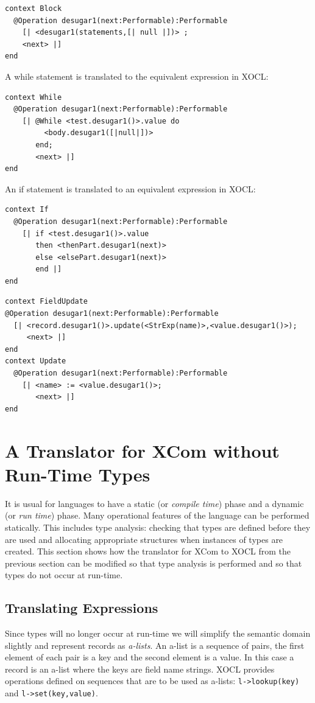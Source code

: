 \begin{lstlisting}
context Block
  @Operation desugar1(next:Performable):Performable
    [| <desugar1(statements,[| null |])> ; 
    <next> |]
end
\end{lstlisting}A while statement is translated to the equivalent expression in XOCL:

\begin{lstlisting}
context While
  @Operation desugar1(next:Performable):Performable
    [| @While <test.desugar1()>.value do
         <body.desugar1([|null|])>
       end;
       <next> |]
end
\end{lstlisting}An if statement is translated to an equivalent expression in XOCL:

\begin{lstlisting}
context If
  @Operation desugar1(next:Performable):Performable
    [| if <test.desugar1()>.value
       then <thenPart.desugar1(next)>
       else <elsePart.desugar1(next)>
       end |]
end
\end{lstlisting}\begin{lstlisting}
context FieldUpdate
@Operation desugar1(next:Performable):Performable
  [| <record.desugar1()>.update(<StrExp(name)>,<value.desugar1()>);
     <next> |]
end
context Update
  @Operation desugar1(next:Performable):Performable
    [| <name> := <value.desugar1()>;
       <next> |]
end
\end{lstlisting}
\section{A Translator for XCom without Run-Time Types}

It is usual for languages to have a static (or \emph{compile time})
phase and a dynamic (or \emph{run time}) phase. Many operational features
of the language can be performed statically. This includes type analysis:
checking that types are defined before they are used and allocating
appropriate structures when instances of types are created. This section
shows how the translator for XCom to XOCL from the previous section
can be modified so that type analysis is performed and so that types
do not occur at run-time.


\subsection{Translating Expressions}

Since types will no longer occur at run-time we will simplify the
semantic domain slightly and represent records as \emph{a-lists}.
An a-list is a sequence of pairs, the first element of each pair is
a key and the second element is a value. In this case a record is
an a-list where the keys are field name strings. XOCL provides operations
defined on sequences that are to be used as a-lists: {\tt l->lookup(key)}
and {\tt l->set(key,value)}.

